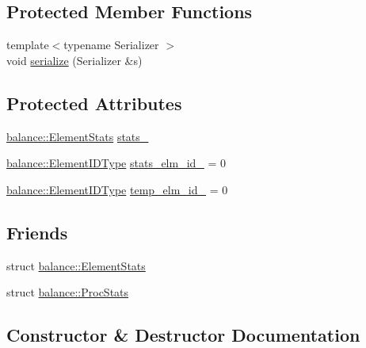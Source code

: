 \subsection*{Protected Member Functions}
\begin{DoxyCompactItemize}
\item 
{\footnotesize template$<$typename Serializer $>$ }\\void \hyperlink{structvt_1_1vrt_1_1collection_1_1_migratable_a2ff02da700394ecd37f3fbb6f0724a3e}{serialize} (Serializer \&s)
\end{DoxyCompactItemize}
\subsection*{Protected Attributes}
\begin{DoxyCompactItemize}
\item 
\hyperlink{structvt_1_1vrt_1_1collection_1_1balance_1_1_element_stats}{balance\+::\+Element\+Stats} \hyperlink{structvt_1_1vrt_1_1collection_1_1_migratable_a3572db662dd07c4f00b32e6198ef8da9}{stats\+\_\+}
\item 
\hyperlink{namespacevt_1_1vrt_1_1collection_1_1balance_a14c8d2c972f2913aa3f1636e5be0a120}{balance\+::\+Element\+I\+D\+Type} \hyperlink{structvt_1_1vrt_1_1collection_1_1_migratable_a5189d4eff453932c6f30f6e870414c1d}{stats\+\_\+elm\+\_\+id\+\_\+} = 0
\item 
\hyperlink{namespacevt_1_1vrt_1_1collection_1_1balance_a14c8d2c972f2913aa3f1636e5be0a120}{balance\+::\+Element\+I\+D\+Type} \hyperlink{structvt_1_1vrt_1_1collection_1_1_migratable_a3c8507a7d474295ac3d5b84e59e0bd1a}{temp\+\_\+elm\+\_\+id\+\_\+} = 0
\end{DoxyCompactItemize}
\subsection*{Friends}
\begin{DoxyCompactItemize}
\item 
struct \hyperlink{structvt_1_1vrt_1_1collection_1_1_migratable_abdce9596911e092af07635bdcc13acd1}{balance\+::\+Element\+Stats}
\item 
struct \hyperlink{structvt_1_1vrt_1_1collection_1_1_migratable_a351f42ef1db264cf1401656f47df21c5}{balance\+::\+Proc\+Stats}
\end{DoxyCompactItemize}


\subsection{Constructor \& Destructor Documentation}
\mbox{\label{structvt_1_1vrt_1_1collection_1_1_migratable_a598f0bb3acfb602d437eab3625b105c5}} 
